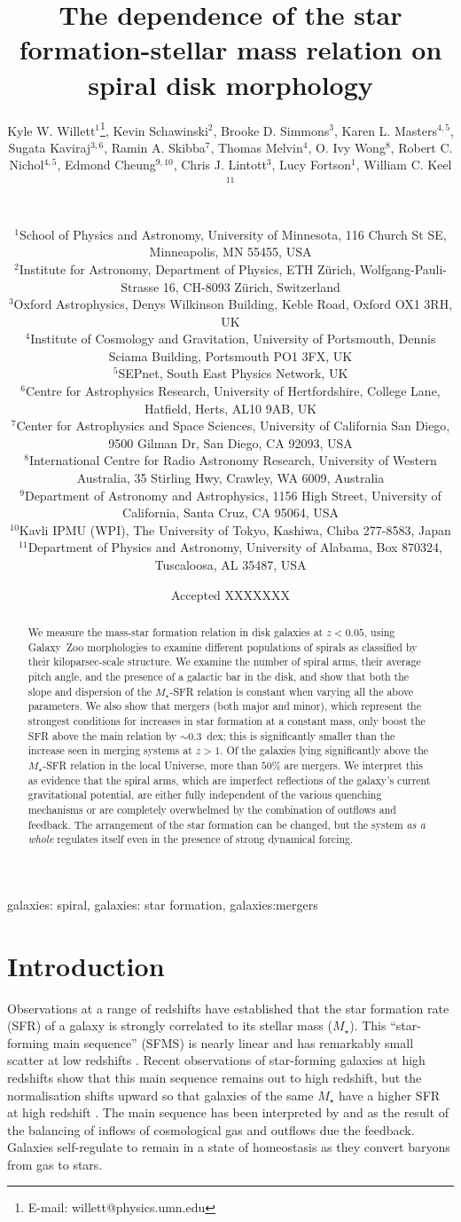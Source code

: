 \documentclass[useAMS,usenatbib]{mn2e}
\title[Disk galaxy morphology and the star-forming main sequence]{The dependence of the star formation-stellar mass relation on spiral disk morphology}
\author[Willett et al.]{
  \parbox[t]{16cm}{
  Kyle W. Willett$^{1}$\thanks{E-mail: willett@physics.umn.edu},
  Kevin Schawinski$^{2}$,
  Brooke D. Simmons$^{3}$,
  Karen L. Masters$^{4,5}$,
  Sugata Kaviraj$^{3,6}$,
  Ramin A. Skibba$^{7}$,
  Thomas Melvin$^{4}$,
  O. Ivy Wong$^{8}$,
  Robert C. Nichol$^{4,5}$,
  Edmond Cheung$^{9,10}$,
  Chris J. Lintott$^{3}$,
  Lucy Fortson$^{1}$,
  William C. Keel$^{11}$
  \\
  }\\
$^{1}$School of Physics and Astronomy, University of Minnesota, 116 Church St SE, Minneapolis, MN 55455, USA \\
$^{2}$Institute for Astronomy, Department of Physics, ETH Z\"urich, Wolfgang-Pauli-Strasse 16, CH-8093 Z\"urich, Switzerland \\
$^{3}$Oxford Astrophysics, Denys Wilkinson Building, Keble Road, Oxford OX1 3RH, UK \\
$^{4}$Institute of Cosmology and Gravitation, University of Portsmouth, Dennis Sciama Building, Portsmouth PO1 3FX, UK \\
$^{5}$SEPnet, South East Physics Network, UK \\
$^{6}$Centre for Astrophysics Research, University of Hertfordshire, College Lane, Hatfield, Herts, AL10 9AB, UK \\
$^{7}$Center for Astrophysics and Space Sciences, University of California San Diego, 9500 Gilman Dr, San Diego, CA 92093, USA \\
$^{8}$International Centre for Radio Astronomy Research, University of Western Australia, 35 Stirling Hwy, Crawley, WA 6009, Australia \\
$^{9}$Department of Astronomy and Astrophysics, 1156 High Street, University of California, Santa Cruz, CA 95064, USA\\
$^{10}$Kavli IPMU (WPI), The University of Tokyo, Kashiwa, Chiba 277-8583, Japan\\
$^{11}$Department of Physics and Astronomy, University of Alabama, Box 870324, Tuscaloosa, AL 35487, USA \\
}
\begin{document}
\date{Accepted XXXXXXX}
\pagerange{\pageref{firstpage}--\pageref{lastpage}} 
\maketitle
\label{firstpage}



\begin{abstract}
We measure the mass-star formation relation in disk galaxies at $z<0.05$, using Galaxy~Zoo morphologies to examine different populations of spirals as classified by their kiloparsec-scale structure. We examine the number of spiral arms, their average pitch angle, and the presence of a galactic bar in the disk, and show that both the slope and dispersion of the $M_\star$-SFR relation is constant when varying all the above parameters. We also show that mergers (both major and minor), which represent the strongest conditions for increases in star formation at a constant mass, only boost the SFR above the main relation by $\sim0.3$~dex; this is significantly smaller than the increase seen in merging systems at $z>1$. Of the galaxies lying significantly above the $M_\star$-SFR relation in the local Universe, more than $50\%$ are mergers. We interpret this as evidence that the spiral arms, which are imperfect reflections of the galaxy's current gravitational potential, are either fully independent of the various quenching mechanisms or are completely overwhelmed by the combination of outflows and feedback. The arrangement of the star formation can be changed, but the system \emph{as a whole} regulates itself even in the presence of strong dynamical forcing. 
\end{abstract}

\begin{keywords}
galaxies: spiral, galaxies: star formation, galaxies:mergers
\end{keywords}


\section{Introduction} \label{sec-intro}

Observations at a range of redshifts have established that the star formation rate (SFR) of a galaxy is strongly correlated to its stellar mass ($M_\star$). This ``star-forming main sequence'' (SFMS) is nearly linear and has remarkably small scatter at low redshifts \citep{bri04}. Recent observations of star-forming galaxies at high redshifts show that this main sequence remains out to high redshift, but the normalisation shifts upward so that galaxies of the same $M_\star$ have a higher SFR at high redshift \citep{noe07,dad07}. The main sequence has been interpreted by \citet{bou10} and \citet{lil13} as the result of the balancing of inflows of cosmological gas and outflows due the feedback. Galaxies self-regulate to remain in a state of homeostasis as they convert baryons from gas to stars. 
\end{document}
